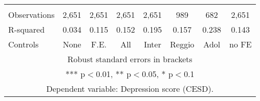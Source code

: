 \begin{tabular}{lccccccc}
 &  &  &  &  &  &  &  \\
Observations & 2,651 & 2,651 & 2,651 & 2,651 & 989 & 682 & 2,651 \\
R-squared & 0.034 & 0.115 & 0.152 & 0.195 & 0.157 & 0.238 & 0.143 \\
 Controls & None & F.E. & All & Inter & Reggio & Adol & no FE \\ \hline
\multicolumn{8}{c}{ Robust standard errors in brackets} \\
\multicolumn{8}{c}{ *** p$<$0.01, ** p$<$0.05, * p$<$0.1} \\
\multicolumn{8}{c}{ Dependent variable: Depression score (CESD).} \\
\end{tabular}
